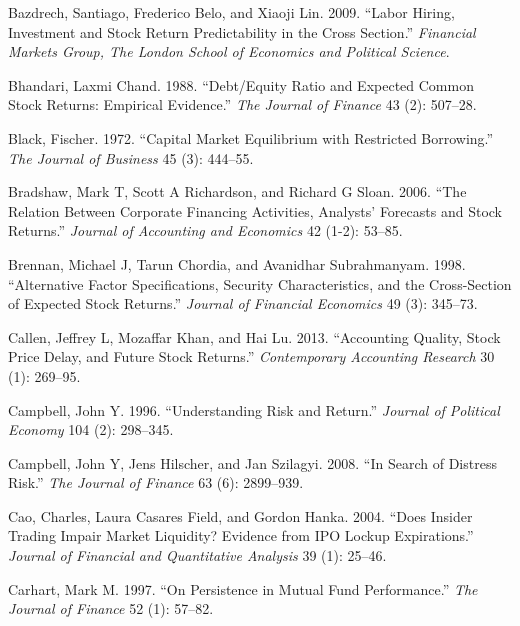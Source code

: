 \documentclass[
  letterpaper,
  DIV=11,
  numbers=noendperiod]{scrreprt}
\newlength{\cslhangindent}
\newlength{\cslentryspacingunit} %
\newenvironment{CSLReferences}[2] %
 {%
  \setlength{\parindent}{0pt}
  \ifodd #1
  \let\oldpar\par
  \def\par{\hangindent=\cslhangindent\oldpar}
  \fi
  \setlength{\parskip}{#2\cslentryspacingunit}
 }%
 {}
\begin{document}
\begin{CSLReferences}{1}{0}
\leavevmode{}%
Bazdrech, Santiago, Frederico Belo, and Xiaoji Lin. 2009. {``Labor
Hiring, Investment and Stock Return Predictability in the Cross
Section.''} \emph{Financial Markets Group, The London School of
Economics and Political Science}.

\leavevmode{}%
Bhandari, Laxmi Chand. 1988. {``Debt/Equity Ratio and Expected Common
Stock Returns: Empirical Evidence.''} \emph{The Journal of Finance} 43
(2): 507--28.

\leavevmode{}%
Black, Fischer. 1972. {``Capital Market Equilibrium with Restricted
Borrowing.''} \emph{The Journal of Business} 45 (3): 444--55.

\leavevmode{}%
Bradshaw, Mark T, Scott A Richardson, and Richard G Sloan. 2006. {``The
Relation Between Corporate Financing Activities, Analysts' Forecasts and
Stock Returns.''} \emph{Journal of Accounting and Economics} 42 (1-2):
53--85.

\leavevmode{}%
Brennan, Michael J, Tarun Chordia, and Avanidhar Subrahmanyam. 1998.
{``Alternative Factor Specifications, Security Characteristics, and the
Cross-Section of Expected Stock Returns.''} \emph{Journal of Financial
Economics} 49 (3): 345--73.

\leavevmode{}%
Callen, Jeffrey L, Mozaffar Khan, and Hai Lu. 2013. {``Accounting
Quality, Stock Price Delay, and Future Stock Returns.''}
\emph{Contemporary Accounting Research} 30 (1): 269--95.

\leavevmode{}%
Campbell, John Y. 1996. {``Understanding Risk and Return.''}
\emph{Journal of Political Economy} 104 (2): 298--345.

\leavevmode{}%
Campbell, John Y, Jens Hilscher, and Jan Szilagyi. 2008. {``In Search of
Distress Risk.''} \emph{The Journal of Finance} 63 (6): 2899--939.

\leavevmode{}%
Cao, Charles, Laura Casares Field, and Gordon Hanka. 2004. {``Does
Insider Trading Impair Market Liquidity? Evidence from IPO Lockup
Expirations.''} \emph{Journal of Financial and Quantitative Analysis} 39
(1): 25--46.

\leavevmode{}%
Carhart, Mark M. 1997. {``On Persistence in Mutual Fund Performance.''}
\emph{The Journal of Finance} 52 (1): 57--82.


\end{CSLReferences}
\end{document}
